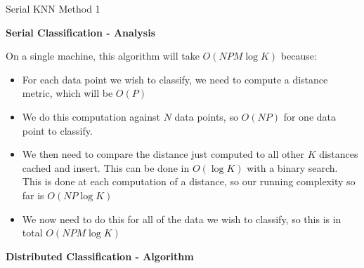 \begin{algorithm}
\DontPrintSemicolon
{}
\caption{Serial KNN Method 1\label{KNN1}}
\end{algorithm}

\vspace{5 mm}
\noindent
\textbf{Serial Classification - Analysis}

\vspace{5 mm}
\noindent
On a single machine, this algorithm will take $O(N P M \log K)$ because:

\begin{itemize}
\item For each data point we wish to classify, we need to compute a distance 
metric, which will be $O(P)$
\item We do this computation against $N$ data points, so $O(N P)$ for one data 
point to classify.
\item We then need to compare the distance just computed to all other $K$ 
distances cached and insert. This can be done in $O(\log K)$ with a binary 
search. This is done at each computation of a distance, so our running 
complexity so far is $O(N P \log K)$
\item We now need to do this for all of the data we wish to classify, so this 
is in total $O(N P M \log K)$
\end{itemize}

\vspace{5 mm}
\noindent
\textbf{Distributed Classification - Algorithm}

